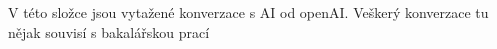 V této složce jsou vytažené konverzace s AI od openAI. Veškerý konverzace tu nějak souvisí s bakalářskou prací